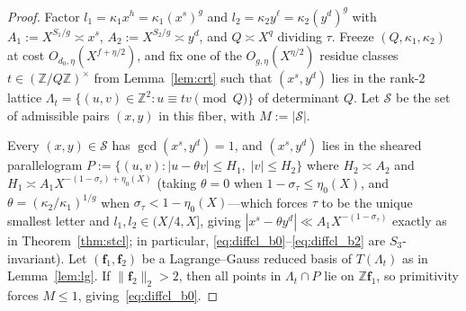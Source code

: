 \documentclass[11pt,a4paper]{amsart}
\theoremstyle{plain}
\theoremstyle{definition}
\theoremstyle{remark}
\newcommand{\Z}{\mathbb{Z}}
\begin{document}
\begin{proof}
Factor $l_1 = \kappa_1 x^h = \kappa_1 (x^s)^g$ and $l_2 = \kappa_2 y^\ell = \kappa_2 (y^d)^g$ with $A_1 := X^{S_1/g} \asymp x^s$, $A_2 := X^{S_2/g} \asymp y^d$, and $Q \asymp X^q$ dividing $\tau$. Freeze $(Q, \kappa_1, \kappa_2)$ at cost $O_{d_0,\eta}(X^{f+\eta/2})$, and fix one of the $O_{g,\eta}(X^{\eta/2})$ residue classes $t \in (\Z/Q\Z)^\times$ from Lemma~\ref{lem:crt} such that $(x^s, y^d)$ lies in the rank-$2$ lattice $\Lambda_t = \{(u,v) \in \Z^2 : u \equiv t v \pmod Q\}$ of determinant $Q$. Let $\mathcal{S}$ be the set of admissible pairs $(x, y)$ in this fiber, with $M := |\mathcal{S}|$.

Every $(x,y) \in \mathcal{S}$ has $\gcd(x^s, y^d) = 1$, and $(x^s, y^d)$ lies in the sheared parallelogram $P := \{(u,v) : |u - \theta v| \le H_1,\; |v| \le H_2\}$ where $H_2 \asymp A_2$ and $H_1 \asymp A_1 X^{-(1-\sigma_\tau)+\eta_0(X)}$ (taking $\theta = 0$ when $1 - \sigma_\tau \le \eta_0(X)$, and $\theta = (\kappa_2/\kappa_1)^{1/g}$ when $\sigma_\tau < 1 - \eta_0(X)$—which forces $\tau$ to be the unique smallest letter and $l_1, l_2 \in (X/4, X]$, giving $|x^s - \theta y^d| \ll A_1 X^{-(1-\sigma_\tau)}$ exactly as in Theorem~\ref{thm:stcl}; in particular, \eqref{eq:diffcl_b0}--\eqref{eq:diffcl_b2} are $S_3$-invariant). Let $(\mathbf{f}_1, \mathbf{f}_2)$ be a Lagrange--Gauss reduced basis of $T(\Lambda_t)$ as in Lemma~\ref{lem:lg}. If $\|\mathbf{f}_2\|_2 > 2$, then all points in $\Lambda_t \cap P$ lie on $\Z\mathbf{f}_1$, so primitivity forces $M \le 1$, giving~\eqref{eq:diffcl_b0}.


\end{proof}
\end{document}
